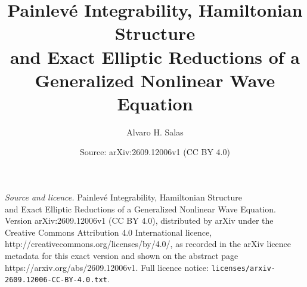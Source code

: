 \documentclass[10pt,a4paper]{amsart}
\title{Painlev\'e Integrability, Hamiltonian Structure\\and Exact Elliptic Reductions of a Generalized Nonlinear Wave Equation}
\author{Alvaro H. Salas}
\date{Source: arXiv:2609.12006v1 (CC BY 4.0)}
\begin{document}
\maketitle

\noindent\emph{Source and licence.} Painlev\'e Integrability, Hamiltonian Structure\\and Exact Elliptic Reductions of a Generalized Nonlinear Wave Equation. Version arXiv:2609.12006v1 (CC BY 4.0), distributed by arXiv under the Creative Commons Attribution 4.0 International licence, http://creativecommons.org/licenses/by/4.0/, as recorded in the arXiv licence metadata for this exact version and shown on the abstract page https://arxiv.org/abs/2609.12006v1. Full licence notice: \texttt{licenses/arxiv-2609.12006-CC-BY-4.0.txt}.\par\smallskip
\end{document}
